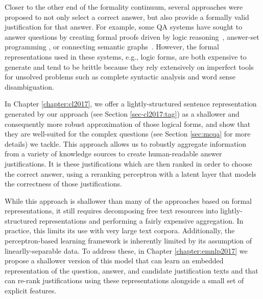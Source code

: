 Closer to the other end of the formality continuum, several approaches were proposed to not only select a correct answer, but also provide a formally valid justification for that answer.  For example, some QA systems have sought to answer questions by creating formal proofs driven by logic reasoning~\citep{moldovan2003cogex,moldovan2007cogex,balduccini2008knowledge,maccartney2009natural,liang2013learning,lewis2013combining}, answer-set programming \citep{baral2006using,baral2011towards,baral2012answering,baral2012knowledge}, or connecting semantic graphs~\citep{banarescu2012amr,sharmatowards}. 
However, the formal representations used in these systems, e.g., logic forms, are both expensive to generate and tend to be brittle because they rely extensively on imperfect tools for unsolved problems such as complete syntactic analysis and word sense disambiguation.

In Chapter \ref{chapter:cl2017}, we offer a lightly-structured sentence representation generated by our approach (see Section \ref{sec-cl2017:tag}) as a shallower and consequently more robust approximation of those logical forms, and show that they are well-suited for the complex questions (see Section \ref{sec:mcqa} for more details) we tackle.
This approach allows us to robustly aggregate information from a variety of knowledge sources to create human-readable answer justifications.  
It is these justifications which are then ranked in order to choose the correct answer, using a reranking perceptron with a latent layer that models the correctness of those justifications.

While this approach is shallower than many of the approaches based on formal representations, it still requires decomposing free text resources into lightly-structured representations and performing a fairly expensive aggregation.  In practice, this limits its use with very large text corpora.  Additionally, the perceptron-based learning framework is inherently limited by its assumption of linearlly-separable data.  To address these, in Chapter \ref{chapter:emnlp2017} we propose a shallower version of this model that can learn an embedded representation of the question, answer, and candidate justification texts and that can re-rank justifications using these representations alongside a small set of explicit features.  

